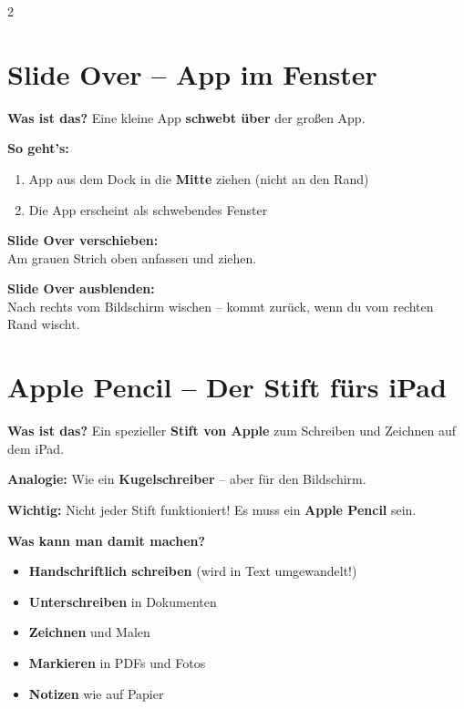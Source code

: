 \documentclass[a4paper,landscape,8pt]{extarticle}
\begin{document}
\begin{multicols}{2}
\vspace{3mm}

\section*{\textcolor{ipadsilver}{Slide Over -- App im Fenster}}

\textbf{Was ist das?} Eine kleine App \textbf{schwebt über} der großen App.

\textbf{So geht's:}
\begin{enumerate}
\item App aus dem Dock in die \textbf{Mitte} ziehen (nicht an den Rand)
\item Die App erscheint als schwebendes Fenster
\end{enumerate}

\textbf{Slide Over verschieben:}\\
Am grauen Strich oben anfassen und ziehen.

\textbf{Slide Over ausblenden:}\\
Nach rechts vom Bildschirm wischen -- kommt zurück, wenn du vom rechten Rand wischt.

\columnbreak

\section*{\textcolor{pencilgold}{Apple Pencil -- Der Stift fürs iPad}}

\textbf{Was ist das?} Ein spezieller \textbf{Stift von Apple} zum Schreiben und Zeichnen auf dem iPad.

\textbf{Analogie:} Wie ein \textbf{Kugelschreiber} -- aber für den Bildschirm.

\textbf{Wichtig:} Nicht jeder Stift funktioniert! Es muss ein \textbf{Apple Pencil} sein.

\vspace{2mm}

\textbf{Was kann man damit machen?}
\begin{itemize}
\item \textbf{Handschriftlich schreiben} (wird in Text umgewandelt!)
\item \textbf{Unterschreiben} in Dokumenten
\item \textbf{Zeichnen} und Malen
\item \textbf{Markieren} in PDFs und Fotos
\item \textbf{Notizen} wie auf Papier
\end{itemize}


\end{multicols}
\end{document}
